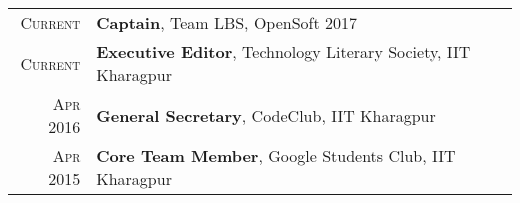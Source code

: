 \documentclass[a4paper,10pt]{extarticle} %
\begin{document}
\begin{tabular}{r|p{15cm}}
\textsc{Current} & \textbf{Captain}, Team LBS, OpenSoft 2017\\
\textsc{Current} & \textbf{Executive Editor}, Technology Literary Society, IIT Kharagpur \\
\textsc{Apr 2016} & \textbf{General Secretary}, CodeClub, IIT Kharagpur \\
\textsc{Apr 2015} & \textbf{Core Team Member}, Google Students Club, IIT Kharagpur
\end{tabular}


\end{document}

